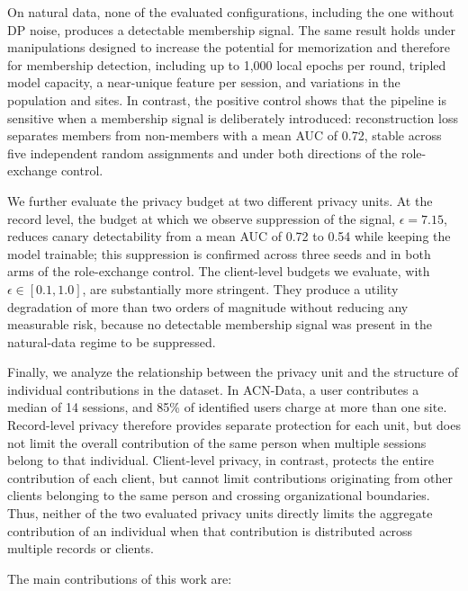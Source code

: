 On natural data, none of the evaluated configurations, including the one without DP noise, produces a detectable membership signal. The same result holds under manipulations designed to increase the potential for memorization and therefore for membership detection, including up to 1,000 local epochs per round, tripled model capacity, a near-unique feature per session, and variations in the population and sites. In contrast, the positive control shows that the pipeline is sensitive when a membership signal is deliberately introduced: reconstruction loss separates members from non-members with a mean AUC of 0.72, stable across five independent random assignments and under both directions of the role-exchange control.

We further evaluate the privacy budget at two different privacy units. At the record level, the budget at which we observe suppression of the signal, $\epsilon = 7.15$, reduces canary detectability from a mean AUC of 0.72 to 0.54 while keeping the model trainable; this suppression is confirmed across three seeds and in both arms of the role-exchange control. The client-level budgets we evaluate, with $\epsilon \in [0.1, 1.0]$, are substantially more stringent. They produce a utility degradation of more than two orders of magnitude without reducing any measurable risk, because no detectable membership signal was present in the natural-data regime to be suppressed.

Finally, we analyze the relationship between the privacy unit and the structure of individual contributions in the dataset. In ACN-Data, a user contributes a median of 14 sessions, and 85\% of identified users charge at more than one site. Record-level privacy therefore provides separate protection for each unit, but does not limit the overall contribution of the same person when multiple sessions belong to that individual. Client-level privacy, in contrast, protects the entire contribution of each client, but cannot limit contributions originating from other clients belonging to the same person and crossing organizational boundaries. Thus, neither of the two evaluated privacy units directly limits the aggregate contribution of an individual when that contribution is distributed across multiple records or clients.

The main contributions of this work are:

